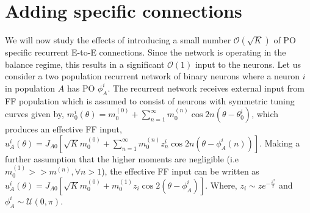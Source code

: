 \section{Adding specific connections}
We will now study the effects of introducing a small number $\mathcal{O} (\sqrt{K})$ of PO specific recurrent E-to-E connections. Since the network is operating in the balance regime, this results in a significant $\mathcal{O}(1)$ input to the neurons. 
Let us consider a two population recurrent network of binary neurons where a neuron $i$ in population $A$ has PO $\phi_A^i$. The recurrent network receives external input from FF population which is assumed to consist of neurons with symmetric tuning curves given by, $m^i_0(\theta) = m^{(0)}_0 + \sum_{n=1}^{\infty} m^{(n)}_0 \cos 2n (\theta - \theta_0^i)$, which produces an effective FF input, $u_A^i(\theta) =  J_{A0}  [\sqrt{K} m_0^{(0)} + \sum_{n=1}^{\infty} m^{(n)}_0  z_n^i \cos2 n (\theta - \phi_A^i(n))]$. Making a further assumption that the higher moments are negligible (i.e $m^{(1)}_0 >> m^{(n)}, \forall n > 1$), the effective FF input can be written as $u_A^i(\theta) =  J_{A0}  [\sqrt{K} m_0^{(0)} + m_0^{(1)}z_i \cos2 (\theta - \phi_A^i)]$. Where,  $z_i \sim z e^{-\frac{z^2}{2}}$ and $\phi_A^i \sim \mathcal{U}(0, \pi)$. 
